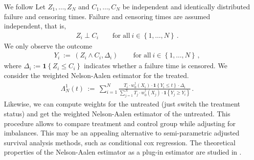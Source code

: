 We follow \cite[Example~3.9.19]{vaart2013}
Let 
$Z_1,\ldots,Z_N$
and
$C_1,\ldots,C_N$ 
be independent and identically distributed failure and censoring  times.
Failure and censoring times are assumed independent, that is, 
\begin{align*}
  Z_i \perp C_i
  \qquad
  \text{for all}\ 
  i\in \left\{ 1,\ldots,N \right\}
  \,.
\end{align*}
We only observe the outcome
\begin{align*}
  Y_i
  \ 
  :=
  \ 
  \left( 
  Z_i
  \land
  C_i
  ,
  \Delta_i
  \right)
  \ 
  \qquad
  \text{for all}\ 
  i\in \left\{ 1,\ldots,N \right\}
  \,,
\end{align*}
where 
$
\Delta_i:=
\mathbf{1}
\left\{ 
  Z_i\le C_i
\right\}
$
indicates whether a failure time is censored. 
We consider the weighted Nelson-Aalen estimator for the treated.
\begin{align*}
  \Lambda^1_N(t)
  \ 
  :=
  \ 
  \sum_{i=1}^{N} \frac{
    T_i\cdot w^\dagger_0(X_i)\cdot\mathbf{1}\left\{ Y_i\le t \right\}
    \cdot \Delta_i
  }{
    \sum_{j=1}^{N} 
    T_j\cdot w^\dagger_0(X_j)\cdot\mathbf{1}\left\{ Y_j\ge Y_i \right\}
  } 
  \,.
\end{align*}
Likewise, we can compute weights for the untreated (just switch the treatment status) and get the weighted Nelson-Aalen estimator of the untreated.
This procedure allows to compare treatment and control group while adjusting for imbalances.
This may be an appealing alternative to semi-parametric adjusted survival analysis methods, such as conditional cox regression.
The theoretical properties of the Nelson-Aalen estimator as a plug-in estimator are studied in \cite[Example~3.9.19]{vaart2013}.

